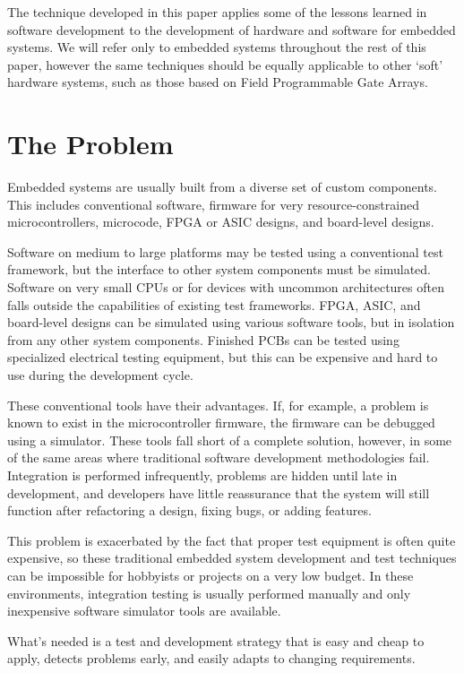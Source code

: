 \documentclass[letterpaper]{article}
\begin{document}
The technique developed in this paper applies some of the lessons learned in software development
to the development of hardware and software for embedded systems. We will refer only to embedded
systems throughout the rest of this paper, however the same techniques should be equally applicable to
other `soft' hardware systems, such as those based on Field Programmable Gate Arrays.

\section{The Problem}

Embedded systems are usually built from a diverse set of custom components. This includes
conventional software, firmware for very resource-constrained microcontrollers, microcode,
FPGA or ASIC designs, and board-level designs.

Software on medium to large platforms may be tested using a conventional test framework,
but the interface to other system components must be simulated. Software on very small
CPUs or for devices with uncommon architectures often falls outside the capabilities of
existing test frameworks. FPGA, ASIC, and board-level designs can be simulated using various
software tools, but in isolation from any other system components. Finished PCBs can be tested
using specialized electrical testing equipment, but this can be expensive and hard to use
during the development cycle.

These conventional tools have their advantages. If, for example, a problem is known
to exist in the microcontroller firmware, the firmware can be debugged using a simulator.
These tools fall short of a complete solution, however, in some of the same areas where traditional
software development methodologies fail. Integration is performed infrequently, problems are
hidden until late in development, and developers have little reassurance that the system will
still function after refactoring a design, fixing bugs, or adding features.

This problem is exacerbated by the fact that proper test equipment is often quite expensive,
so these traditional embedded system development and test techniques can be impossible for
hobbyists or projects on a very low budget. In these environments, integration testing is
usually performed manually and only inexpensive software simulator tools are available.

What's needed is a test and development strategy that is easy and cheap to apply, detects
problems early, and easily adapts to changing requirements.
\end{document}
